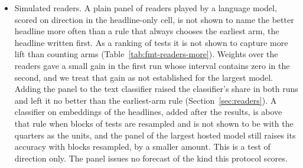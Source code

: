\begin{itemize}
\item Simulated readers. A plain panel of readers played by a language model, scored on direction in the headline-only cell, is not shown to name the better headline more often than a rule that always chooses the earliest arm, the headline written first. As a ranking of tests it is not shown to capture more lift than counting arms (Table~\ref{tab:fmt-readers-more}). Weights over the readers gave a small gain in the first run whose interval contains zero in the second, and we treat that gain as not established for the largest model. Adding the panel to the text classifier raised the classifier's share in both runs and left it no better than the earliest-arm rule (Section~\ref{sec:readers}). A classifier on embeddings of the headlines, added after the results, is above that rule when blocks of tests are resampled and is not shown to be with the quarters as the units, and the panel of the largest hosted model still raises its accuracy with blocks resampled, by a smaller amount. This is a test of direction only. The panel issues no forecast of the kind this protocol scores.
\end{itemize}

\label{sec:production}
